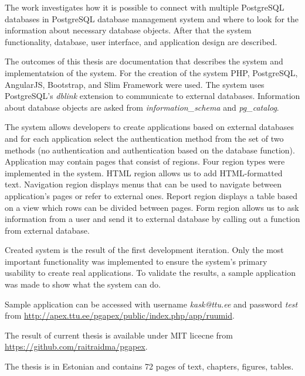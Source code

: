 \documentclass[a4paper,12pt]{article} %
\begin{document}
The work investigates how it is possible to connect with multiple PostgreSQL databases in PostgreSQL database management system and where to look for the information about necessary database objects. After that the system functionality, database, user interface, and application design are described.\par

The outcomes of this thesis are documentation that describes the system and implementatsion of the system. For the creation of the system PHP, PostgreSQL, AngularJS, Bootstrap, and Slim Framework were used. The system uses PostgreSQL's \textit{dblink} extension to communicate to external databases. Information about database objects are asked from \textit{information\_schema} and \textit{pg\_catalog}.
\par
The system allows developers to create applications based on external databases and for each application select the authentication method from the set of two methods (no authentication and authentication based on the database function). Application may contain pages that consist of regions.
Four region types were implemented in the system. HTML region allows us to add HTML-formatted text. Navigation region displays menus that can be used to navigate between application's pages or refer to external ones. Report region displays a table based on a view which rows can be divided between pages. Form region allows us to ask information from a user and send it to external database by calling out a function from external database.
\par
Created system is the result of the first development iteration. Only the most important functionality was implemented to ensure the system's primary usability to create real applications. To validate the results, a sample application  was made to show what the system can do.\par
Sample application can be accessed with username \textit{kask@ttu.ee} and password \textit{test} from \newline \url{http://apex.ttu.ee/pgapex/public/index.php/app/ruumid}.
\par
The result of current thesis is available under MIT licecne from \newline \url{https://github.com/raitraidma/pgapex}.
\par
The thesis is in Estonian and contains 72 pages of text, \totalsections{} chapters, \totalfigures{} figures, \totaltables{} tables.
\pagebreak
\end{document}
